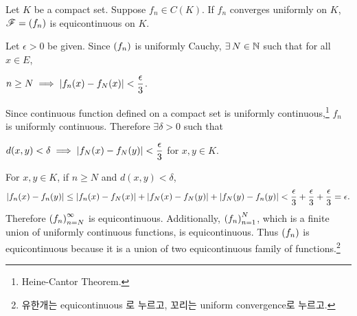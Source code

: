 \medskip

 Let \(K\) be a compact set. Suppose \(f_n \in C(K)\). If \(f_n\) converges uniformly on \(K\), \(\mathscr{F} = \left( f_n \right)\) is equicontinuous on \(K\).

\pf Let \(\epsilon > 0\) be given. Since \(\left( f_n \right)\) is uniformly Cauchy, \(\exists N\in \N\) such that for all \(x \in E\),
\begin{center}
    \(n\geq N \implies \left| f_n(x)  - f_N(x) \right| < \dfrac{\epsilon}{3}\).
\end{center}
Since continuous function defined on a compact set is uniformly continuous,\footnote{Heine-Cantor Theorem.} \(f_n\) is uniformly continuous. Therefore \(\exists \delta > 0\) such that
\begin{center}
    \(d(x, y) < \delta \implies \left| f_N(x) - f_N(y) \right| < \dfrac{\epsilon}{3}\) for \(x, y \in K\).
\end{center}
For \(x, y\in K\), if \(n \geq N\) and \(d(x, y) < \delta\),
\[
    \left| f_n(x) - f_n(y) \right| \leq \left| f_n(x) - f_N(x) \right| + \left| f_N(x) - f_N(y) \right| + \left| f_N(y) - f_n(y) \right| < \frac{\epsilon}{3} + \frac{\epsilon}{3} + \frac{\epsilon}{3} = \epsilon.
\]
Therefore \(\left( f_n \right)_{n=N}^\infty\) is equicontinuous. Additionally, \(\left( f_n \right)_{n=1}^N\), which is a finite union of uniformly continuous functions, is equicontinuous. Thus \(\left( f_n \right)\) is equicontinuous because it is a union of two equicontinuous family of functions.\footnote{유한개는 equicontinuous 로 누르고, 꼬리는 uniform convergence로 누르고.}

\pagebreak
